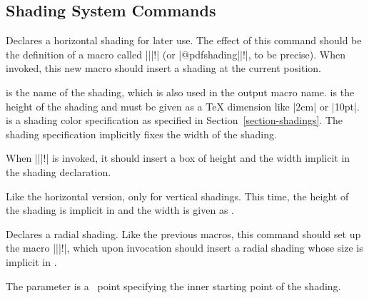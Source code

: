 \subsection{Shading System Commands}


\begin{command}{\pgfsys@horishading{}}
  Declares a horizontal shading for later use. The effect of this
  command should be the definition of a macro called |\@pgfshading||!|
  (or |\csname @pdfshading||!\endcsname|, to be
  precise). When invoked, this new macro should insert a shading at
  the current position.

   is the name of the shading, which is also used in the
  output macro name.  is the height of the shading and
  must be given as a TeX dimension like |2cm| or
  |10pt|.  is a shading color
  specification as specified in Section~\ref{section-shadings}. The
  shading specification implicitly fixes the width of the shading.

  When |\@pgfshading||!| is invoked, it should insert a box
  of height  and the width implicit in the shading
  declaration.
\end{command}


\begin{command}{\pgfsys@vertshading{}}
  Like the horizontal version, only for vertical shadings. This time,
  the height of the shading is implicit in  and
  the width is given as .
\end{command}

\begin{command}{\pgfsys@radialshading{}}
  Declares a radial shading. Like the previous macros, this command
  should set up the macro |\@pgfshading||!|, which upon
  invocation should insert a radial shading whose size is implicit in
  .

  The parameter  is a \pgfname\ point
  specifying the inner starting point of the shading.
\end{command}



